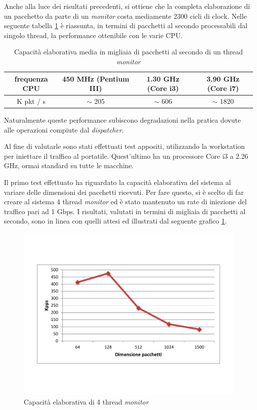 Anche alla luce dei risultati precedenti, si ottiene che la completa elaborazione di un pacchetto da parte di un \emph{monitor} costa mediamente 2300 cicli di clock. Nelle seguente tabella \ref{perf-monitor} è riassunta, in termini di pacchetti al secondo processabili dal singolo thread, la performance ottenibile con le varie CPU.

\clearpage
\begin{table}[H]
\begin{center}
\begin{tabular}{|c|c|c|c|}
\hline
frequenza CPU & 450 MHz (Pentium III) & 1.30 GHz (Core i3) & 3.90 GHz (Core i7) \\
\hline
K pkt / s & $\sim$ 205 & $\sim$ 606 & $\sim$ 1820 \\
\hline
\end{tabular}
\caption{Capacità elaborativa media in migliaia di pacchetti al secondo di un thread \emph{monitor}}
\label{perf-monitor}
\end{center}
\end{table}

Naturalmente queste performance subiscono degradazioni nella pratica dovute alle operazioni compiute dal \emph{dispatcher}.

Al fine di valutarle sono stati effettuati test appositi, utilizzando la workstation per iniettare il traffico al portatile. Quest'ultimo ha un processore Core i3 a 2.26 GHz, ormai standard su tutte le macchine.

\clearpage
Il primo test effettuato ha riguardato la capacità elaborativa del sistema al variare delle dimensioni dei pacchetti ricevuti. Per fare questo, si è scelto di far creare al sistema 4 thread \emph{monitor} ed è stato mantenuto un rate di iniezione del traffico pari ad 1 Gbps. I risultati, valutati in termini di migliaia di pacchetti al secondo, sono in linea con quelli attesi ed illustrati dal seguente grafico \ref{kpps}.

\begin{figure}[H]
\begin{center}
\includegraphics[scale=0.5]{img/kpps.pdf}
\caption{Capacità elaborativa di 4 thread \emph{monitor}}\label{kpps}
\end{center}
\end{figure}

